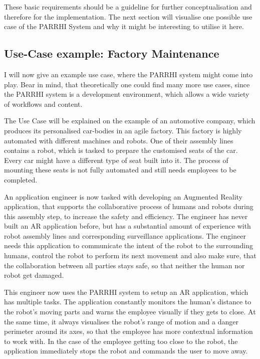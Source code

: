 These basic requirements should be a guideline for further conceptualisation and therefore for the implementation. The next section will visualise one possible use case of the PARRHI System and why it might be interesting to utilise it here.

\subsection{Use-Case example: Factory Maintenance}\label{Section:UseCaseDefinition}

I will now give an example use case, where the PARRHI system might come into play. Bear in mind, that theoretically one could find many more use cases, since the PARRHI system is a development environment, which allows a wide variety of workflows and content. 

The Use Case will be explained on the example of an automotive company, which produces its personalised car-bodies in an agile factory. This factory is highly automated with different machines and robots. One of their assembly lines contains a robot, which is tasked to prepare the customised seats of the car. Every car might have a different type of seat built into it. The process of mounting these seats is not fully automated and still needs employees to be completed.

An application engineer is now tasked with developing an Augmented Reality application, that supports the collaborative process of humans and robots during this assembly step, to increase the safety and efficiency. The engineer has never built an AR application before, but has a substantial amount of experience with robot assembly lines and corresponding surveillance applications. The engineer needs this application to communicate the intent of the robot to the surrounding humans, control the robot to perform its next movement and also make sure, that the collaboration between all parties stays safe, so that neither the human nor robot get damaged. 

This engineer now uses the PARRHI system to setup an AR application, which has multiple tasks. The application constantly monitors the human's distance to the robot's moving parts and warns the employee visually if they gets to close. At the same time, it always visualises the robot's range of motion and a danger perimeter around its axes, so that the employee has more contextual information to work with. In the case of the employee getting too close to the robot, the application immediately stops the robot and commands the user to move away.

